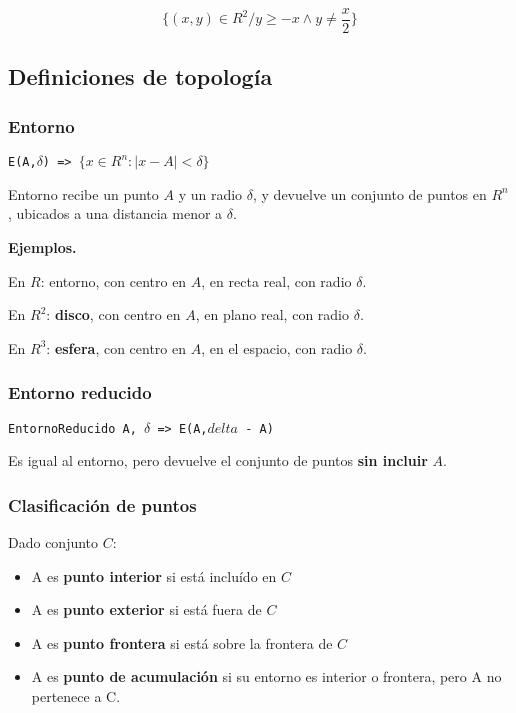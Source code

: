 \begin{equation*}
    \{(x,y) \in R^{2} / y \geq -x \land y \neq \frac{x}{2}\}
\end{equation*}

\subsection{Definiciones de topología}

\subsubsection{Entorno}

\texttt{E(A,\(\delta\)) => \(\{x \in R^{n}: |x-A| < \delta\}\)}

Entorno recibe un punto \(A\) y un radio \(\delta\),
y devuelve un conjunto de puntos en \(R^{n}\),
ubicados a una distancia menor a \(\delta\).

\textbf{Ejemplos.}

En \(R\): entorno, con centro en \(A\), en recta real, con radio \(\delta\).

En \(R^{2}\): \textbf{disco}, con centro en \(A\), en plano real, con radio \(\delta\).

En \(R^{3}\): \textbf{esfera}, con centro en \(A\), en el espacio, con radio \(\delta\).

\subsubsection{Entorno reducido}

\texttt{EntornoReducido A, \(\delta\) => E(A,\(delta\) - A)}

Es igual al entorno,
pero devuelve el conjunto de puntos \textbf{sin incluir} \(A\).

\subsubsection{Clasificación de puntos}

Dado conjunto \(C\):

\begin{itemize}
    \item A es \textbf{punto interior} si está incluído en \(C\)
    \item A es \textbf{punto exterior} si está fuera de \(C\)
    \item A es \textbf{punto frontera} si está sobre la frontera de \(C\)
    \item A es \textbf{punto de acumulación} si su entorno es interior o frontera, pero A no pertenece a C.
\end{itemize}

